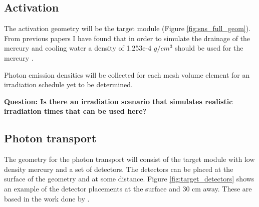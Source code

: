 \subsection{Activation}
The activation geometry will be the target module
(Figure \ref{fig:sns_full_geom}).
From previous papers I have found
that in order to simulate the drainage of the mercury and cooling water
a density of 1.253e-4 $g/cm^{3}$ should be used
for the mercury \cite{SNS2018}.

Photon emission densities will be collected for each mesh
volume element for an irradiation schedule yet to be determined.

\textbf{Question: Is there
an irradiation scenario that simulates realistic irradiation times
that can be used here?}

\subsection{Photon transport}
The geometry for the photon transport  will consist of the target module
with low density mercury
and a set of detectors. The detectors can be placed at the surface
of the geometry and at some distance. Figure \ref{fig:target_detectors} shows an example
of the detector placements at the surface and 30 cm away. These are based
in the work done by \cite{SNS2018}.

